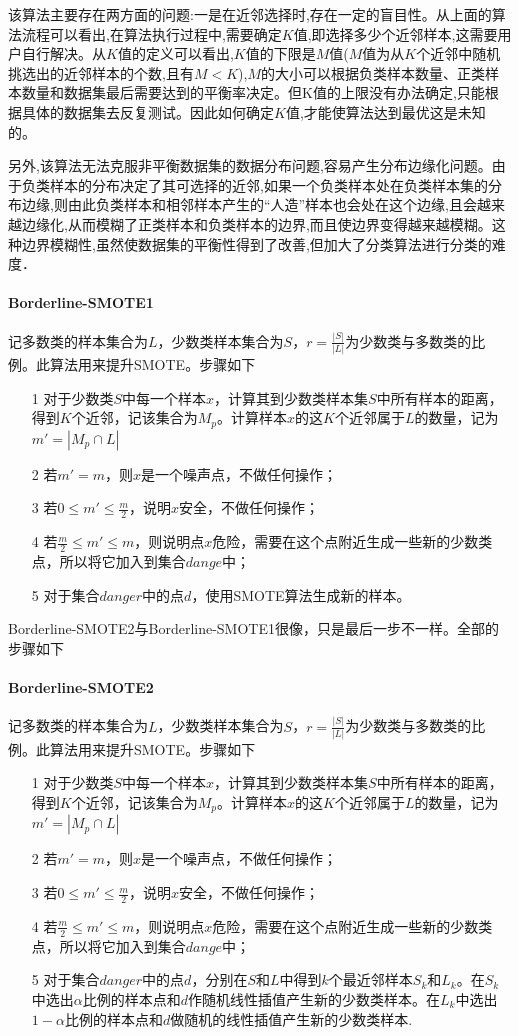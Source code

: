 该算法主要存在两方面的问题:一是在近邻选择时,存在一定的盲目性。从上面的算法流程可以看出,在算法执行过程中,需要确定$K$值,即选择多少个近邻样本,这需要用户自行解决。从$K$值的定义可以看出,$K$值的下限是$M$值($M$值为从$K$个近邻中随机挑选出的近邻样本的个数,且有$M < K$),$M$的大小可以根据负类样本数量、正类样本数量和数据集最后需要达到的平衡率决定。但K值的上限没有办法确定,只能根据具体的数据集去反复测试。因此如何确定$K$值,才能使算法达到最优这是未知的。 

另外,该算法无法克服非平衡数据集的数据分布问题,容易产生分布边缘化问题。由于负类样本的分布决定了其可选择的近邻,如果一个负类样本处在负类样本集的分布边缘,则由此负类样本和相邻样本产生的“人造”样本也会处在这个边缘,且会越来越边缘化,从而模糊了正类样本和负类样本的边界,而且使边界变得越来越模糊。这种边界模糊性,虽然使数据集的平衡性得到了改善,但加大了分类算法进行分类的难度．

\paragraph{Borderline-SMOTE1}记多数类的样本集合为$L$，少数类样本集合为$S$，$r=\frac{|S|}{|L|}$为少数类与多数类的比例。此算法用来提升SMOTE。步骤如下
\begin{itemize}
\item[1] 对于少数类$S$中每一个样本$x$，计算其到少数类样本集$S$中所有样本的距离，得到$K$个近邻，记该集合为$M_p$。计算样本$x$的这$K$个近邻属于$L$的数量，记为$m'=|M_p\cap L|$
\item[2] 若$m'=m$，则$x$是一个噪声点，不做任何操作；
\item[3] 若$0\leq m'\leq \frac{m}{2}$，说明$x$安全，不做任何操作；
\item[4] 若$\frac{m}{2}\leq m' \leq m$，则说明点$x$危险，需要在这个点附近生成一些新的少数类点，所以将它加入到集合$dange$中；
\item[5] 对于集合$danger$中的点$d$，使用SMOTE算法生成新的样本。
\end{itemize}

Borderline-SMOTE2与Borderline-SMOTE1很像，只是最后一步不一样。全部的步骤如下
\paragraph{Borderline-SMOTE2}记多数类的样本集合为$L$，少数类样本集合为$S$，$r=\frac{|S|}{|L|}$为少数类与多数类的比例。此算法用来提升SMOTE。步骤如下
\begin{itemize}
\item[1] 对于少数类$S$中每一个样本$x$，计算其到少数类样本集$S$中所有样本的距离，得到$K$个近邻，记该集合为$M_p$。计算样本$x$的这$K$个近邻属于$L$的数量，记为$m'=|M_p\cap L|$
\item[2] 若$m'=m$，则$x$是一个噪声点，不做任何操作；
\item[3] 若$0\leq m'\leq \frac{m}{2}$，说明$x$安全，不做任何操作；
\item[4] 若$\frac{m}{2}\leq m' \leq m$，则说明点$x$危险，需要在这个点附近生成一些新的少数类点，所以将它加入到集合$dange$中；
\item[5] 对于集合$danger$中的点$d$，分别在$S$和$L$中得到$k$个最近邻样本$S_k$和$L_k$。在$S_k$中选出$\alpha$比例的样本点和$d$作随机线性插值产生新的少数类样本。在$L_k$中选出$1-\alpha$比例的样本点和$d$做随机的线性插值产生新的少数类样本.
\end{itemize}

